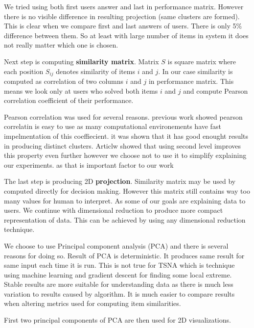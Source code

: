\documentclass[
  digital, %
  table,   %
  nolof,     %
  nolot,     %
  nocover
]{fithesis3}
\begin{document}
We tried using both first users answer and last in performance matrix.
However there is no visible difference in resulting projection (same
clusters are formed). This is clear when we compare first and last
answers of users. There is only 5\% difference between them. So at least
with large number of items in system it does not really matter which one
is chosen.


Next step is computing \textbf{similarity matrix}. Matrix $S$ is square
matrix where each position $S_{ij}$ denotes similarity of items
$i$ and $j$. In our case similarity is computed as correlation of
two columns $i$ and $j$ in performance matrix. This means we look
only at users who solved both items $i$ and $j$ and compute
Pearson correlation coefficient of their performance.

Pearson correlation was used for several reasons.
previous work showed 
pearson correlatin is easy to use as many computational environements have fast impelmentation of this coeffiecient.
it was shown that it has good enought results in producing distinct clusters. Articlw showed that using second level improves this property even further however we choose not to use it to simplify explaining our experiments. as that is important factor to our work


The last step is producing 2D \textbf{projection}. Similarity matrix may be used by computed directly for decision making. However this matrix still contains way too many values for human to interpret. As some of our goals are explaining data to users. We continue with dimensional reduction to produce more compact representation of data. This can be
achieved by using any dimensional reduction technique.


We choose to use Principal component analysis (PCA) and there is several
reasons for doing so. Result of PCA is deterministic. It produces same
result for same input each time it is run. This is not true for TSNA which is technique
using machine learning and gradient descent for finding some local
extreme. Stable results are more suitable for understanding data as
there is much less variation to results caused by algorithm. It is much easier
to compare results when altering metrics used for computing item
similarities.

First two principal components of PCA are then used for 2D
visualizations.
\end{document}
